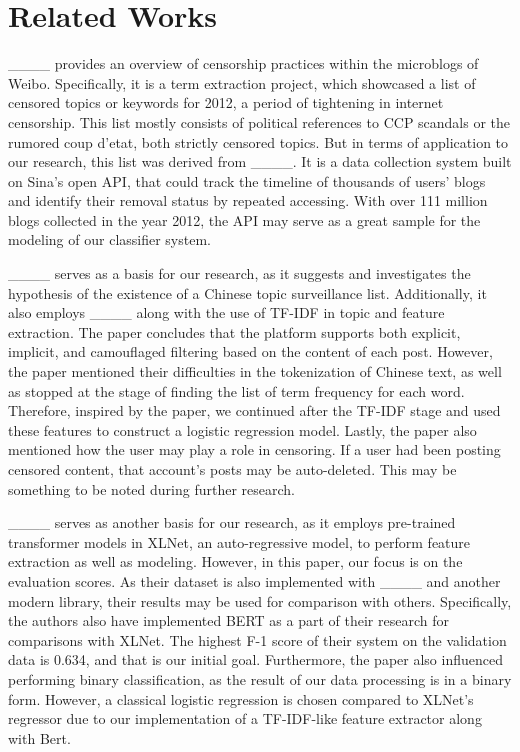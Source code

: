\section{Related Works}
____ provides an overview of censorship practices within the microblogs of Weibo. Specifically, it is a term extraction project, which showcased a list of censored topics or keywords for 2012, a period of tightening in internet censorship. This list mostly consists of political references to CCP scandals or the rumored coup d'etat, both strictly censored topics. But in terms of application to our research, this list was derived from ____. It is a data collection system built on Sina’s open API, that could track the timeline of thousands of users’ blogs and identify their removal status by repeated accessing. With over 111 million blogs collected in the year 2012, the API may serve as a great sample for the modeling of our classifier system.


____ serves as a basis for our research, as it suggests and investigates the hypothesis of the existence of a Chinese topic surveillance list. Additionally, it also employs ____ along with the use of TF-IDF in topic and feature extraction. The paper concludes that the platform supports both explicit, implicit, and camouflaged filtering based on the content of each post. However, the paper mentioned their difficulties in the tokenization of Chinese text, as well as stopped at the stage of finding the list of term frequency for each word. Therefore, inspired by the paper, we continued after the TF-IDF stage and used these features to construct a logistic regression model. Lastly, the paper also mentioned how the user may play a role in censoring. If a user had been posting censored content, that account’s posts may be auto-deleted. This may be something to be noted during further research.


____ serves as another basis for our research, as it employs pre-trained transformer models in XLNet, an auto-regressive model, to perform feature extraction as well as modeling. However, in this paper, our focus is on the evaluation scores. As their dataset is also implemented with ____ and another modern library, their results may be used for comparison with others. Specifically, the authors also have implemented BERT as a part of their research for comparisons with XLNet. The highest F-1 score of their system on the validation data is 0.634, and that is our initial goal. Furthermore, the paper also influenced performing binary classification, as the result of our data processing is in a binary form. However, a classical logistic regression is chosen compared to XLNet’s regressor due to our implementation of a TF-IDF-like feature extractor along with Bert.


